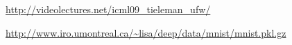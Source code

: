 \documentclass[12pt,fleqn]{article}\usepackage{../common}
\begin{document}
\inputminted[fontsize=\footnotesize]{python}{rbmp.py}

\inputminted[fontsize=\footnotesize]{python}{test_mnist.py}

\url{http://videolectures.net/icml09_tieleman_ufw/}

\url{http://www.iro.umontreal.ca/~lisa/deep/data/mnist/mnist.pkl.gz}
\end{document}
